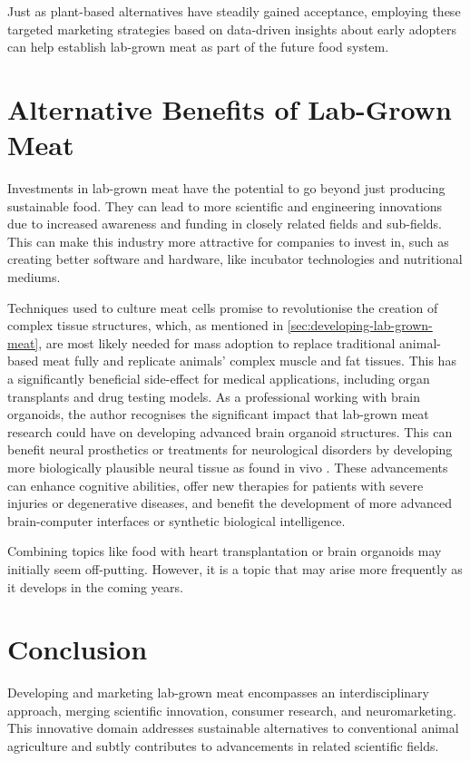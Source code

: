 \documentclass[10pt]{article}
\begin{document}
\begin{sloppypar}
  Just as plant-based alternatives have steadily gained acceptance, employing these targeted marketing strategies based on data-driven insights about early adopters can help establish lab-grown meat as part of the future food system.

  \section{Alternative Benefits of Lab-Grown Meat}
  \label{sec:alternative-benefits}

  Investments in lab-grown meat have the potential to go beyond just producing sustainable food. They can lead to more scientific and engineering innovations due to increased awareness and funding in closely related fields and sub-fields. This can make this industry more attractive for companies to invest in, such as creating better software and hardware, like incubator technologies and nutritional mediums.


  Techniques used to culture meat cells promise to revolutionise the creation of complex tissue structures, which, as mentioned in \autoref{sec:developing-lab-grown-meat}, are most likely needed for mass adoption to replace traditional animal-based meat fully and replicate animals’ complex muscle and fat tissues. This has a significantly beneficial side-effect for medical applications, including organ transplants and drug testing models. As a professional working with brain organoids, the author recognises the significant impact that lab-grown meat research could have on developing advanced brain organoid structures. This can benefit neural prosthetics or treatments for neurological disorders by developing more biologically plausible neural tissue as found in vivo \citep{sharma_3d_2020}. These advancements can enhance cognitive abilities, offer new therapies for patients with severe injuries or degenerative diseases, and benefit the development of more advanced brain-computer interfaces or synthetic biological intelligence.

  Combining topics like food with heart transplantation or brain organoids may initially seem off-putting. However, it is a topic that may arise more frequently as it develops in the coming years.

  \section{Conclusion}
  \label{sec:conclusion}
  Developing and marketing lab-grown meat encompasses an interdisciplinary approach, merging scientific innovation, consumer research, and neuromarketing. This innovative domain addresses sustainable alternatives to conventional animal agriculture and subtly contributes to advancements in related scientific fields.


\end{sloppypar}
\end{document}
